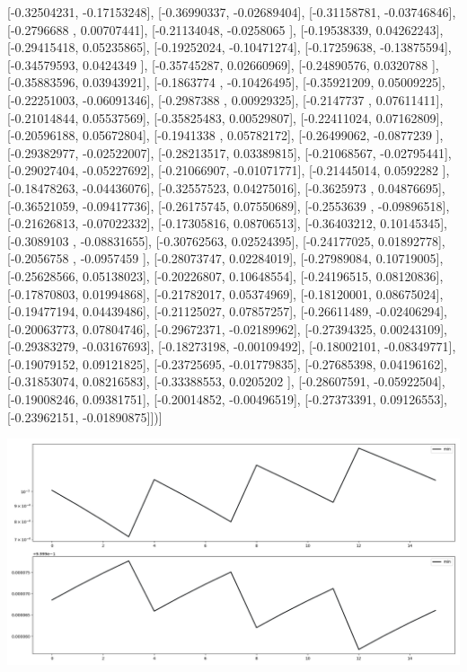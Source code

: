 \documentclass{article}
\begin{document}
       [-0.32504231, -0.17153248],
       [-0.36990337, -0.02689404],
       [-0.31158781, -0.03746846],
       [-0.2796688 ,  0.00707441],
       [-0.21134048, -0.0258065 ],
       [-0.19538339,  0.04262243],
       [-0.29415418,  0.05235865],
       [-0.19252024, -0.10471274],
       [-0.17259638, -0.13875594],
       [-0.34579593,  0.0424349 ],
       [-0.35745287,  0.02660969],
       [-0.24890576,  0.0320788 ],
       [-0.35883596,  0.03943921],
       [-0.1863774 , -0.10426495],
       [-0.35921209,  0.05009225],
       [-0.22251003, -0.06091346],
       [-0.2987388 ,  0.00929325],
       [-0.2147737 ,  0.07611411],
       [-0.21014844,  0.05537569],
       [-0.35825483,  0.00529807],
       [-0.22411024,  0.07162809],
       [-0.20596188,  0.05672804],
       [-0.1941338 ,  0.05782172],
       [-0.26499062, -0.0877239 ],
       [-0.29382977, -0.02522007],
       [-0.28213517,  0.03389815],
       [-0.21068567, -0.02795441],
       [-0.29027404, -0.05227692],
       [-0.21066907, -0.01071771],
       [-0.21445014,  0.0592282 ],
       [-0.18478263, -0.04436076],
       [-0.32557523,  0.04275016],
       [-0.3625973 ,  0.04876695],
       [-0.36521059, -0.09417736],
       [-0.26175745,  0.07550689],
       [-0.2553639 , -0.09896518],
       [-0.21626813, -0.07022332],
       [-0.17305816,  0.08706513],
       [-0.36403212,  0.10145345],
       [-0.3089103 , -0.08831655],
       [-0.30762563,  0.02524395],
       [-0.24177025,  0.01892778],
       [-0.2056758 , -0.0957459 ],
       [-0.28073747,  0.02284019],
       [-0.27989084,  0.10719005],
       [-0.25628566,  0.05138023],
       [-0.20226807,  0.10648554],
       [-0.24196515,  0.08120836],
       [-0.17870803,  0.01994868],
       [-0.21782017,  0.05374969],
       [-0.18120001,  0.08675024],
       [-0.19477194,  0.04439486],
       [-0.21125027,  0.07857257],
       [-0.26611489, -0.02406294],
       [-0.20063773,  0.07804746],
       [-0.29672371, -0.02189962],
       [-0.27394325,  0.00243109],
       [-0.29383279, -0.03167693],
       [-0.18273198, -0.00109492],
       [-0.18002101, -0.08349771],
       [-0.19079152,  0.09121825],
       [-0.23725695, -0.01779835],
       [-0.27685398,  0.04196162],
       [-0.31853074,  0.08216583],
       [-0.33388553,  0.0205202 ],
       [-0.28607591, -0.05922504],
       [-0.19008246,  0.09381751],
       [-0.20014852, -0.00496519],
       [-0.27373391,  0.09126553],
       [-0.23962151, -0.01890875]])]
\begin{center}
\includegraphics[scale=.9]{report_pickled_controls110/control_dpn_all.png}

\end{center}
\end{document}
